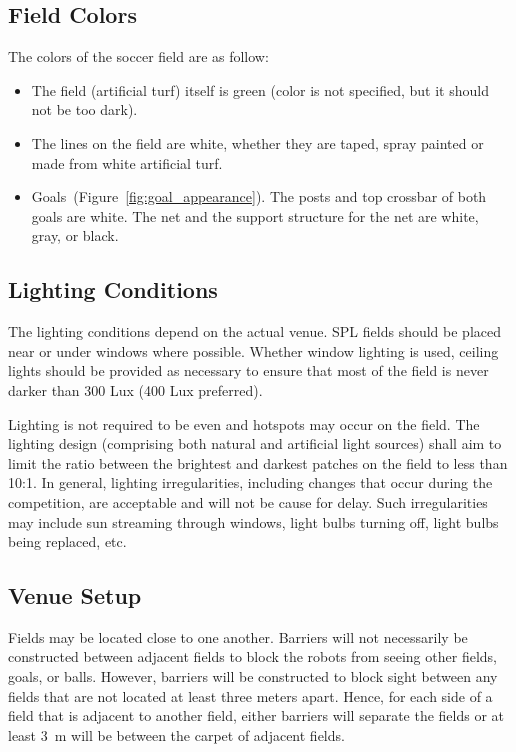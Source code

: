 \subsection{Field Colors}
\label{sec:field_colors}
The colors of the soccer field are as follow:

\begin{itemize}

\item The field (artificial turf) itself is green (color is not specified, but it should not be too dark).

\item The lines on the field are white, whether they are taped, spray painted or made from white artificial turf.

\item Goals~(\cf Figure~\ref{fig:goal_appearance}). The posts and top crossbar of both goals are white. The net and the support structure for the net are white, gray, or black.

\end{itemize}

\subsection{Lighting Conditions}
\label{sec:lightConditions}
The lighting conditions depend on the actual venue. SPL fields should be placed near or under windows where possible. Whether window lighting is used, ceiling lights should be provided as necessary to ensure that most of the field is never darker than 300 Lux (400 Lux preferred).

Lighting is not required to be even and hotspots may occur on the field. The lighting design (comprising both natural and artificial light sources) shall aim to limit the ratio between the brightest and darkest patches on the field to less than 10:1. In general, lighting irregularities, including changes that occur during the competition, are acceptable and will not be cause for delay.  Such irregularities may include sun streaming through windows, light bulbs turning off, light bulbs being replaced, etc.

\subsection{Venue Setup}
\label{sec:boundaries}
Fields may be located close to one another.  Barriers will not necessarily be constructed between adjacent fields to block the robots from seeing other fields, goals, or balls. However, barriers will be constructed to block sight between any fields that are not located at least three meters apart. Hence, for each side of a field that is adjacent to another field, either barriers will separate the fields or at least \qty{3}{\metre} will be between the carpet of adjacent fields.

